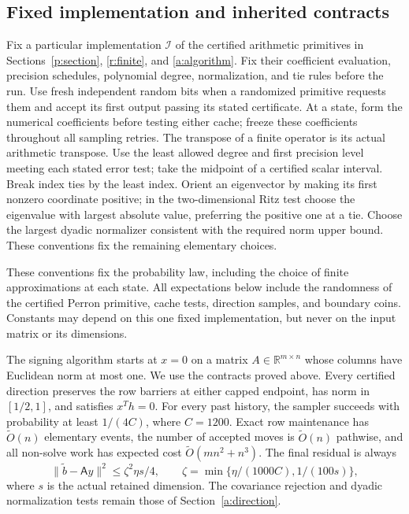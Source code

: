 \documentclass[11pt]{amsart}
\theoremstyle{definition}\newtheorem{definition}[theorem]{Definition}
\theoremstyle{remark}\newtheorem{remark}[theorem]{Remark}
\numberwithin{equation}{section}
\begin{document}
\subsection{Fixed implementation and inherited contracts}\label{d:contracts}
Fix a particular implementation $\mathcal I$ of the certified arithmetic
primitives in Sections~\ref{p:section}, \ref{r:finite}, and
\ref{a:algorithm}. Fix their coefficient evaluation, precision schedules,
polynomial degree, normalization, and tie rules before the run. Use fresh
independent random bits when a randomized primitive requests them and
accept its first output passing its stated certificate. At a state, form
the numerical coefficients before testing either cache; freeze these
coefficients throughout all sampling retries. The transpose of a finite
operator is its actual arithmetic transpose. Use the least allowed degree
and first precision level meeting each stated error test; take the
midpoint of a certified scalar interval. Break index ties by the least
index. Orient an eigenvector by making its first nonzero coordinate
positive; in the two-dimensional Ritz test choose the eigenvalue with
largest absolute value, preferring the positive one at a tie. Choose
the largest dyadic normalizer consistent with the required norm upper
bound. These conventions fix the remaining elementary choices.

These conventions fix the probability law, including the choice of
finite approximations at each state. All expectations
below include the randomness of the certified Perron primitive, cache
tests, direction samples, and boundary coins. Constants may depend on this
one fixed implementation, but never on the input matrix or its dimensions.

The signing algorithm starts at $x=0$ on a matrix $A\in\mathbb R^{m\times n}$
whose columns have Euclidean norm at most one. We use the contracts proved above. Every certified direction preserves
the row barriers at either capped endpoint, has norm in $[1/2,1]$, and
satisfies $x^Th=0$. For every past history, the sampler succeeds with
probability at least $1/(4C)$, where $C=1200$. Exact row maintenance has
$\widetilde O(n)$ elementary events, the number of accepted moves is
$\widetilde O(n)$ pathwise, and all non-solve work has expected cost
$\widetilde O(mn^2+n^3)$.
The final residual is always
\begin{equation}\label{d:residual}
 \|\widetilde b-\mathsf Ay\|^2\le\zeta^2\eta s/4,
 \qquad \zeta=\min\{\eta/(1000C),1/(100s)\},
\end{equation}
where $s$ is the actual retained dimension. The covariance rejection and
dyadic normalization tests remain those of Section~\ref{a:direction}.
\end{document}
